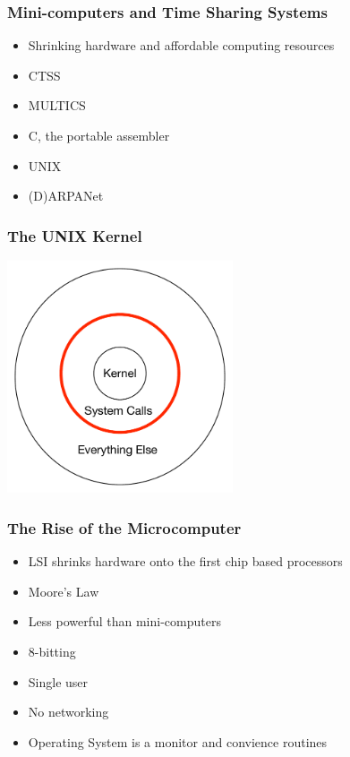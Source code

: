 \documentclass[pdftex]{beamer} %
\begin{document}
\begin{frame}
  \frametitle{Mini-computers and Time Sharing Systems}
  \begin{itemize}
  \item Shrinking hardware and affordable computing resources
  \item CTSS
  \item MULTICS
  \item C, the portable assembler
  \item UNIX
  \item (D)ARPANet
  \end{itemize}
\end{frame}

\begin{frame}
  \frametitle{The UNIX Kernel}
\centering
  \includegraphics[width=0.5\textwidth]{../../figures/simplified-kernel.pdf}  
\end{frame}

\begin{frame}
  \frametitle{The Rise of the Microcomputer}
  \begin{itemize}
  \item LSI shrinks hardware onto the first chip based processors
  \item Moore's Law
  \item Less powerful than mini-computers
  \item 8-bitting
  \item Single user
  \item No networking
  \item Operating System is a monitor and convience routines
  \end{itemize}
\end{frame}
\end{document}

